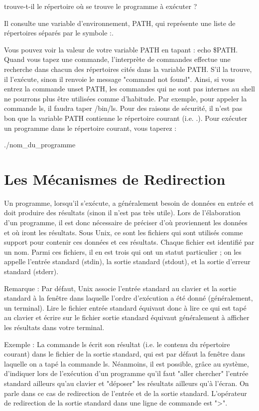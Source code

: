 \documentclass[10pt,a4paper]{article}
\begin{document}
trouve-t-il le répertoire où se trouve le programme à exécuter ?

Il consulte une variable d'environnement, PATH, qui représente une liste de répertoires séparés par le symbole :.

Vous pouvez voir la valeur de votre variable PATH en tapant : echo \$PATH. Quand vous tapez une commande, l'interprète de commandes effectue une recherche dans chacun des répertoires cités dans la variable PATH. S'il la trouve, il l'exécute, sinon il renvoie le message "command not found". Ainsi, si vous entrez la commande unset PATH, les commandes qui ne sont pas internes au shell ne pourrons plus être utilisées comme d'habitude. Par exemple, pour appeler la commande ls, il faudra taper /bin/ls. Pour des raisons de sécurité, il n'est pas bon que la variable PATH contienne le répertoire courant (i.e. .). Pour exécuter un programme dans le répertoire courant, vous taperez :
\begin{mylisting}
./nom\_du\_programme
\end{mylisting}

\section{Les Mécanismes de Redirection}

Un programme, lorsqu'il s'exécute, a généralement besoin de données en entrée et doit produire des résultats (sinon il n'est pas très utile). Lors de l'élaboration d'un programme, il est donc nécessaire de préciser d'où proviennent les données et où iront les résultats. Sous Unix, ce sont les fichiers qui sont utilisés comme
support pour contenir ces données et ces résultats. Chaque fichier est identifié par un nom. Parmi ces fichiers, il en est trois qui ont un statut particulier ; on les appelle l'entrée standard (stdin), la sortie standard (stdout), et la sortie d'erreur standard (stderr).

Remarque : Par défaut, Unix associe l'entrée standard au clavier et la sortie standard à la fenêtre dans laquelle l'ordre d'exécution a été donné (généralement, un terminal). Lire le fichier entrée standard équivaut donc à lire ce qui est tapé au clavier et écrire sur le fichier sortie standard équivaut généralement à afficher les résultats dans votre terminal.

Exemple : La commande ls écrit son résultat (i.e. le contenu du répertoire courant) dans le fichier de la sortie standard, qui est par défaut la fenêtre dans laquelle on a tapé la commande ls. Néanmoins, il est possible, grâce au système, d'indiquer lors de l'exécution d'un programme qu'il faut "aller chercher" l'entrée standard ailleurs qu'au clavier et "déposer" les résultats ailleurs qu'à l'écran. On parle dans ce cas de redirection de l'entrée et de la sortie  standard. L'opérateur de redirection de la sortie standard dans une ligne de commande est ">".
\end{document}

